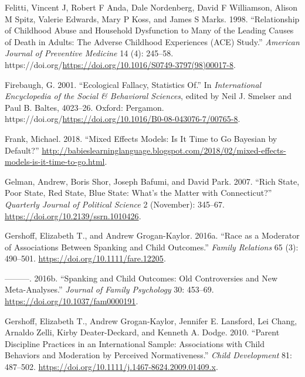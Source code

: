 \documentclass[
  letterpaper,
  DIV=11,
  numbers=noendperiod]{scrreprt}
\newlength{\cslhangindent}
\newlength{\cslentryspacingunit} %
\newenvironment{CSLReferences}[2] %
 {%
  \setlength{\parindent}{0pt}
  \ifodd #1
  \let\oldpar\par
  \def\par{\hangindent=\cslhangindent\oldpar}
  \fi
  \setlength{\parskip}{#2\cslentryspacingunit}
 }%
 {}
\begin{document}
\begin{CSLReferences}{1}{0}
\leavevmode{}%
Felitti, Vincent J, Robert F Anda, Dale Nordenberg, David F Williamson,
Alison M Spitz, Valerie Edwards, Mary P Koss, and James S Marks. 1998.
{``Relationship of Childhood Abuse and Household Dysfunction to Many of
the Leading Causes of Death in Adults: The Adverse Childhood Experiences
(ACE) Study.''} \emph{American Journal of Preventive Medicine} 14 (4):
245--58.
https://doi.org/\url{https://doi.org/10.1016/S0749-3797(98)00017-8}.

\leavevmode{}%
Firebaugh, G. 2001. {``Ecological Fallacy, Statistics Of.''} In
\emph{International Encyclopedia of the Social \& Behavioral Sciences},
edited by Neil J. Smelser and Paul B. Baltes, 4023--26. Oxford:
Pergamon.
https://doi.org/\url{https://doi.org/10.1016/B0-08-043076-7/00765-8}.

\leavevmode{}%
Frank, Michael. 2018. {``Mixed Effects Models: Is It Time to Go
{B}ayesian by Default?''}
\url{http://babieslearninglanguage.blogspot.com/2018/02/mixed-effects-models-is-it-time-to-go.html}.

\leavevmode{}%
Gelman, Andrew, Boris Shor, Joseph Bafumi, and David Park. 2007. {``Rich
State, Poor State, Red State, Blue State: What's the Matter with
Connecticut?''} \emph{Quarterly Journal of Political Science} 2
(November): 345--67. \url{https://doi.org/10.2139/ssrn.1010426}.

\leavevmode{}%
Gershoff, Elizabeth T., and Andrew Grogan-Kaylor. 2016a. {``{Race as a
Moderator of Associations Between Spanking and Child Outcomes}.''}
\emph{Family Relations} 65 (3): 490--501.
\url{https://doi.org/10.1111/fare.12205}.

\leavevmode{}%
---------. 2016b. {``Spanking and Child Outcomes: Old Controversies and
New Meta-Analyses.''} \emph{Journal of Family Psychology} 30: 453--69.
\url{https://doi.org/10.1037/fam0000191}.

\leavevmode{}%
Gershoff, Elizabeth T., Andrew Grogan-Kaylor, Jennifer E. Lansford, Lei
Chang, Arnaldo Zelli, Kirby Deater-Deckard, and Kenneth A. Dodge. 2010.
{``Parent Discipline Practices in an International Sample: Associations
with Child Behaviors and Moderation by Perceived Normativeness.''}
\emph{Child Development} 81: 487--502.
\url{https://doi.org/10.1111/j.1467-8624.2009.01409.x}.


\end{CSLReferences}
\end{document}
